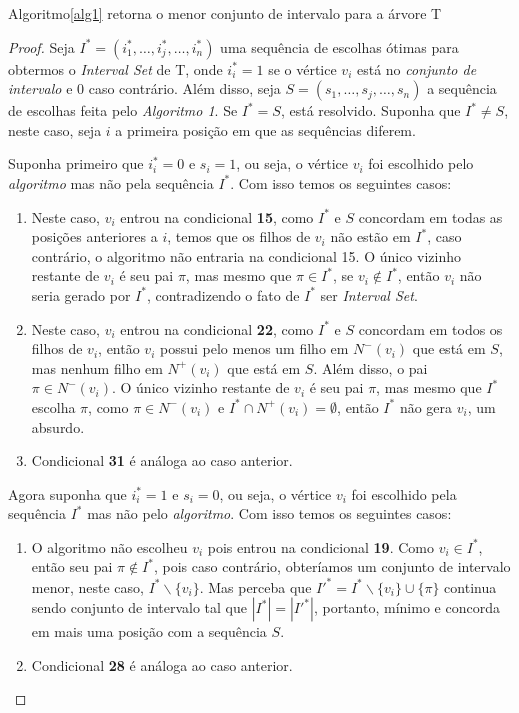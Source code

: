 \begin{theorem}
  Algoritmo\ref{alg1} retorna o menor conjunto de intervalo para a árvore T
  \begin{proof}
  Seja $I^* = (i^*_1, \ldots, i^*_j, \ldots, i^*_n)$ uma sequência de escolhas ótimas para obtermos o \emph{Interval Set} de T, onde $i^*_i = 1$ se o vértice $v_i$ está no \emph{conjunto de intervalo} e $0$ caso contrário. Além disso, seja $S = (s_1, \ldots, s_j, \ldots, s_n)$ a sequência de escolhas feita pelo \emph{Algoritmo 1}. Se $I^*=S$, está resolvido. Suponha que $I^* \neq S$, neste caso, seja $i$ a primeira posição em que as sequências diferem.

  Suponha primeiro que $i^*_i = 0$ e $s_i = 1$, ou seja, o vértice $v_i$ foi escolhido pelo \emph{algoritmo} mas não pela sequência $I^*$. Com isso temos os seguintes casos:

  \begin{enumerate}
    \item Neste caso, $v_i$ entrou na condicional \textbf{15}, como $I^*$ e $S$ concordam em todas as posições anteriores a $i$, temos que os filhos de $v_i$ não estão em $I^*$, caso contrário, o algoritmo não entraria na condicional 15. O único vizinho restante de $v_i$ é seu pai $\pi$, mas mesmo que $\pi \in I^*$, se $v_i \notin I^*$, então $v_i$ não seria gerado por $I^*$, contradizendo o fato de $I^*$ ser \emph{Interval Set}.
    \item Neste caso, $v_i$ entrou na condicional \textbf{22}, como $I^*$ e $S$ concordam em todos os filhos de $v_i$, então $v_i$ possui pelo menos um filho em $N^-(v_i)$ que está em $S$, mas nenhum filho em $N^+(v_i)$ que está em $S$. Além disso, o pai $\pi \in N^-(v_i)$. O único vizinho restante de $v_i$ é seu pai $\pi$, mas mesmo que $I^*$ escolha $\pi$, como $\pi \in N^-(v_i)$ e $I^*\cap N^+(v_i) = \emptyset$, então $I^*$ não gera $v_i$, um absurdo.
    \item Condicional \textbf{31} é análoga ao caso anterior.
  \end{enumerate}

  Agora suponha que $i^*_i=1$ e $s_i = 0$, ou seja, o vértice $v_i$ foi escolhido pela sequência $I^*$ mas não pelo \emph{algoritmo}. Com isso temos os seguintes casos:

  \begin{enumerate}
    \item O algoritmo não escolheu $v_i$ pois entrou na condicional \textbf{19}. Como $v_i \in I^*$, então seu pai $\pi \notin I^*$, pois caso contrário, obteríamos um conjunto de intervalo menor, neste caso, $I^*\backslash \{v_i\}$. Mas perceba que $I'^* = I^*\backslash \{v_i\} \cup \{\pi\}$ continua sendo conjunto de intervalo tal que $|I^*| = |I'^*|$, portanto, mínimo e concorda em mais uma posição com a sequência $S$.
    \item Condicional \textbf{28} é análoga ao caso anterior.
  \end{enumerate}
  \end{proof}
\end{theorem}